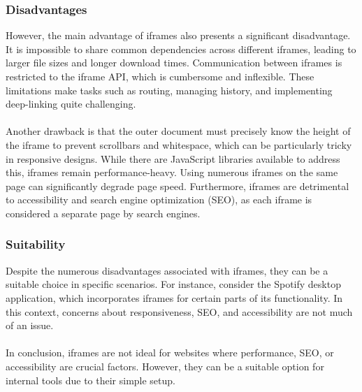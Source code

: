 \subsubsection{Disadvantages}
However, the main advantage of iframes also presents a significant disadvantage. It is impossible to share common dependencies across different iframes, leading to larger file sizes and longer download times. Communication between iframes is restricted to the iframe API, which is cumbersome and inflexible. These limitations make tasks such as routing, managing history, and implementing deep-linking quite challenging. \\\\
Another drawback is that the outer document must precisely know the height of the iframe to prevent scrollbars and whitespace, which can be particularly tricky in responsive designs. While there are JavaScript libraries available to address this, iframes remain performance-heavy. Using numerous iframes on the same page can significantly degrade page speed. Furthermore, iframes are detrimental to accessibility and search engine optimization (SEO), as each iframe is considered a separate page by search engines. \cite{MicrofrontendsInAction}\cite{MFApplication}\cite{MFFowler}

\subsubsection{Suitability}
Despite the numerous disadvantages associated with iframes, they can be a suitable choice in specific scenarios. For instance, consider the Spotify desktop application, which incorporates iframes for certain parts of its functionality. In this context, concerns about responsiveness, SEO, and accessibility are not much of an issue.\\\\
In conclusion, iframes are not ideal for websites where performance, SEO, or accessibility are crucial factors. However, they can be a suitable option for internal tools due to their simple setup. \cite{MicrofrontendsInAction}

